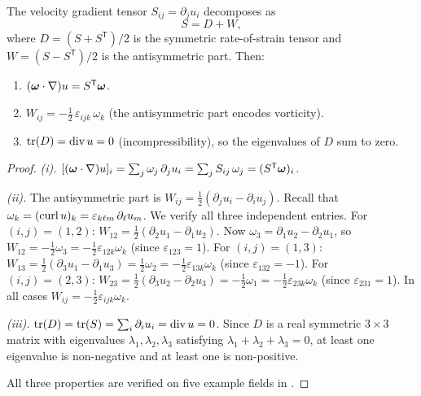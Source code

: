 \begin{proposition}\label{prop:stretching-tensor}
  The velocity gradient tensor $S_{ij} = \partial_j u_i$ decomposes as
  \begin{equation}\label{eq:strain-decomp}
    S = D + W,
  \end{equation}
  where $D = (S + S^{\mathsf{T}})/2$ is the symmetric rate-of-strain tensor and
  $W = (S - S^{\mathsf{T}})/2$ is the antisymmetric part.  Then:
  \begin{enumerate}[label=(\roman*)]
    \item $(\boldsymbol{\omega} \cdot \nabla)u = S^{\mathsf{T}}\boldsymbol{\omega}$.
    \item $W_{ij} = -\tfrac{1}{2}\,\varepsilon_{ijk}\,\omega_k$
      (the antisymmetric part encodes vorticity).
    \item $\operatorname{tr}(D) = \operatorname{div} u = 0$ (incompressibility), so the
      eigenvalues of $D$ sum to zero.
  \end{enumerate}
\end{proposition}

\begin{proof}
  \emph{(i).}
  $[(\boldsymbol{\omega} \cdot \nabla)u]_i = \sum_j \omega_j\,\partial_j u_i
  = \sum_j S_{ij}\,\omega_j = (S^{\mathsf{T}}\boldsymbol{\omega})_i$.

  \emph{(ii).}
  The antisymmetric part is
  $W_{ij} = \tfrac{1}{2}(\partial_j u_i - \partial_i u_j)$.
  Recall that $\omega_k = (\operatorname{curl} u)_k = \varepsilon_{k\ell m}\,\partial_\ell u_m$.
  We verify all three independent entries.
  For $(i,j) = (1,2)$:
  $W_{12} = \tfrac{1}{2}(\partial_2 u_1 - \partial_1 u_2)$.
  Now $\omega_3 = \partial_1 u_2 - \partial_2 u_1$, so
  $W_{12} = -\tfrac{1}{2}\omega_3 = -\tfrac{1}{2}\varepsilon_{12k}\omega_k$
  (since $\varepsilon_{123} = 1$).
  For $(i,j) = (1,3)$:
  $W_{13} = \tfrac{1}{2}(\partial_3 u_1 - \partial_1 u_3)
  = \tfrac{1}{2}\omega_2 = -\tfrac{1}{2}\varepsilon_{13k}\omega_k$
  (since $\varepsilon_{132} = -1$).
  For $(i,j) = (2,3)$:
  $W_{23} = \tfrac{1}{2}(\partial_3 u_2 - \partial_2 u_3)
  = -\tfrac{1}{2}\omega_1 = -\tfrac{1}{2}\varepsilon_{23k}\omega_k$
  (since $\varepsilon_{231} = 1$).
  In all cases $W_{ij} = -\tfrac{1}{2}\varepsilon_{ijk}\omega_k$.

  \emph{(iii).}
  $\operatorname{tr}(D) = \operatorname{tr}(S)
  = \sum_i \partial_i u_i = \operatorname{div} u = 0$.
  Since $D$ is a real symmetric $3 \times 3$ matrix with eigenvalues
  $\lambda_1, \lambda_2, \lambda_3$ satisfying
  $\lambda_1 + \lambda_2 + \lambda_3 = 0$, at least one eigenvalue is
  non-negative and at least one is non-positive.

  All three properties are verified on five example fields in .
\end{proof}

